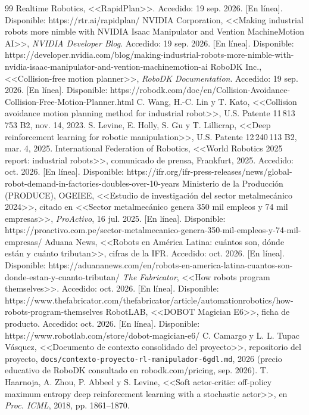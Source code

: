 \documentclass[11pt,a4paper,twoside]{article}
\begin{document}
\begin{thebibliography}{99}
 Realtime Robotics, <<RapidPlan>>. Accedido: 19 sep. 2026. [En línea]. Disponible: https://rtr.ai/rapidplan/
 NVIDIA Corporation, <<Making industrial robots more nimble with NVIDIA Isaac Manipulator and Vention MachineMotion AI>>, \emph{NVIDIA Developer Blog}. Accedido: 19 sep. 2026. [En línea]. Disponible: https://developer.nvidia.com/blog/making-industrial-robots-more-nimble-with-nvidia-isaac-manipulator-and-vention-machinemotion-ai
 RoboDK Inc., <<Collision-free motion planner>>, \emph{RoboDK Documentation}. Accedido: 19 sep. 2026. [En línea]. Disponible: https://robodk.com/doc/en/Collision-Avoidance-Collision-Free-Motion-Planner.html
 C. Wang, H.-C. Lin y T. Kato, <<Collision avoidance motion planning method for industrial robot>>, U.S. Patente 11\,813\,753 B2, nov. 14, 2023.
 S. Levine, E. Holly, S. Gu y T. Lillicrap, <<Deep reinforcement learning for robotic manipulation>>, U.S. Patente 12\,240\,113 B2, mar. 4, 2025.
 International Federation of Robotics, <<World Robotics 2025 report: industrial robots>>, comunicado de prensa, Frankfurt, 2025. Accedido: oct. 2026. [En línea]. Disponible: https://ifr.org/ifr-press-releases/news/global-robot-demand-in-factories-doubles-over-10-years
 Ministerio de la Producción (PRODUCE), OGEIEE, <<Estudio de investigación del sector metalmecánico 2024>>, citado en <<Sector metalmecánico genera 350 mil empleos y 74 mil empresas>>, \emph{ProActivo}, 16 jul. 2025. [En línea]. Disponible: https://proactivo.com.pe/sector-metalmecanico-genera-350-mil-empleos-y-74-mil-empresas/
 Aduana News, <<Robots en América Latina: cuántos son, dónde están y cuánto tributan>>, cifras de la IFR. Accedido: oct. 2026. [En línea]. Disponible: https://aduananews.com/en/robots-en-america-latina-cuantos-son-donde-estan-y-cuanto-tributan/
 \emph{The Fabricator}, <<How robots program themselves>>. Accedido: oct. 2026. [En línea]. Disponible: https://www.thefabricator.com/thefabricator/article/automationrobotics/how-robots-program-themselves
 RobotLAB, <<DOBOT Magician E6>>, ficha de producto. Accedido: oct. 2026. [En línea]. Disponible: https://www.robotlab.com/store/dobot-magician-e6/
 C. Camargo y L. L. Tupac Vásquez, <<Documento de contexto consolidado del proyecto>>, repositorio del proyecto, \texttt{docs/contexto-proyecto-rl-manipulador-6gdl.md}, 2026 (precio educativo de RoboDK consultado en robodk.com/pricing, sep. 2026).
 T. Haarnoja, A. Zhou, P. Abbeel y S. Levine, <<Soft actor-critic: off-policy maximum entropy deep reinforcement learning with a stochastic actor>>, en \emph{Proc. ICML}, 2018, pp. 1861--1870.

\end{thebibliography}
\end{document}
